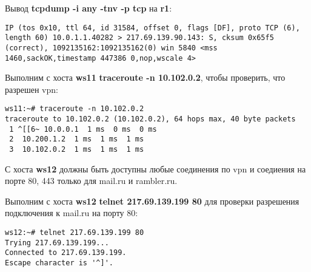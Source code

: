 \documentclass[a4paper,12pt]{article}
\begin{document}
Вывод \textbf{tcpdump -i any -tnv -p tcp} на \textbf{r1}:
\begin{Verbatim}
IP (tos 0x10, ttl 64, id 31584, offset 0, flags [DF], proto TCP (6), length 60) 10.0.1.1.40282 > 217.69.139.90.143: S, cksum 0x65f5 (correct), 1092135162:1092135162(0) win 5840 <mss 1460,sackOK,timestamp 447386 0,nop,wscale 4>
\end{Verbatim}

Выполним с хоста \textbf{ws11} \textbf{traceroute -n 10.102.0.2},  чтобы проверить,
что разрешен vpn:
\begin{Verbatim}
ws11:~# traceroute -n 10.102.0.2
traceroute to 10.102.0.2 (10.102.0.2), 64 hops max, 40 byte packets
 1 ^[[6~ 10.0.0.1  1 ms  0 ms  0 ms
 2  10.200.1.2  1 ms  1 ms  1 ms
 3  10.102.0.2  1 ms  1 ms  1 ms
\end{Verbatim}


С хоста \textbf{ws12} должны быть доступны любые соединения по vpn и
соедиения на порте 80, 443 только для mail.ru и rambler.ru. 

Выполним с хоста \textbf{ws12} \textbf{telnet 217.69.139.199 80} для проверки
разрешения подключения к mail.ru на порту 80:
\begin{Verbatim}
ws12:~# telnet 217.69.139.199 80
Trying 217.69.139.199...
Connected to 217.69.139.199.
Escape character is '^]'.
\end{Verbatim}
\end{document}
